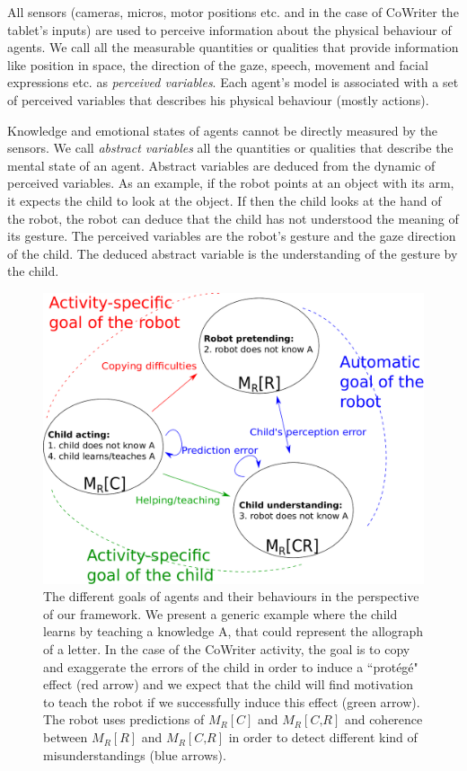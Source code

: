 \documentclass[10pt,a4paper]{article}
\begin{document}
All sensors (cameras, micros, motor positions etc. and in the case of CoWriter the tablet's inputs) are used to perceive information about the physical behaviour of agents. 
We call all the measurable quantities or qualities that provide information like position in space, the direction of the gaze, speech, movement and facial expressions etc. as \textit{perceived variables}. 
Each agent's model is associated with a set of perceived variables that describes his physical behaviour (mostly actions).

Knowledge and emotional states of agents cannot be directly measured by the  sensors. 
We call \textit{abstract variables} all the quantities or qualities that describe the mental state of an agent. 
Abstract variables are deduced from the dynamic of perceived variables. 
As an example, if the robot points at an object with its arm, it expects the child to look at the object. 
If then the child looks at the hand of the robot, the robot can deduce that the child has not understood the meaning of its gesture. 
The perceived variables are the robot's gesture and the gaze direction of the child. 
The deduced abstract variable is the understanding of the gesture by the child. 


\begin{figure}[!]
\centering
\includegraphics[width=0.6\columnwidth]{mutual_behaviour}
\caption{\small The different goals of agents and their behaviours in the perspective of our framework. We present a generic example where the child learns by teaching a knowledge A, that could represent the allograph of a letter. In the case of the CoWriter activity, the goal is to copy and exaggerate the errors of the child in order to induce a ``prot\'eg\'e" effect (red arrow) and we expect that the child will find motivation to teach the robot if we successfully induce this effect (green arrow). The robot uses predictions of $ M_R\left[\textit{C}\right]$ and $ M_R\left[\textit{C,R}\right]$ and coherence between $ M_R\left[\textit{R}\right]$ and $ M_R\left[\textit{C,R}\right]$ in order to detect different kind of misunderstandings (blue arrows).}
\label{mm}
\end{figure} 
\end{document}
